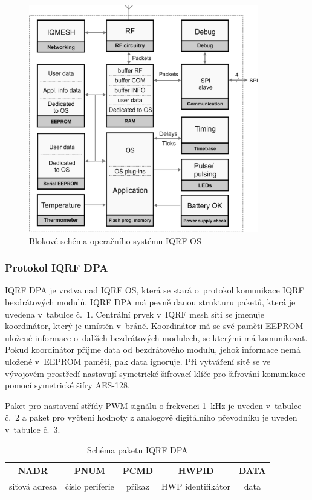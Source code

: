 \documentclass[12pt,a4paper]{article}
\begin{document}
\begin{figure}[H]
\centering
\label{fig:foto/iqrf-os}
\includegraphics[width = 100mm]{img/iqrf/os-blokove-schema.png}
\caption{Blokové schéma operačního systému IQRF OS}
\end{figure}

\newpage

\subsubsection{Protokol IQRF DPA}

IQRF DPA\cite{iqrf/dpa} je vrstva nad IQRF OS, která se stará o~protokol komunikace IQRF bezdrátových modulů. IQRF DPA má pevně danou strukturu paketů, která je uvedena v~tabulce č.~1. Centrální prvek v~IQRF mesh síti se jmenuje koordinátor, který je umístěn v~bráně. Koordinátor má se své paměti EEPROM uložené informace o~dalších bezdrátových modulech, se kterými má komunikovat. Pokud koordinátor přijme data od bezdrátového modulu, jehož informace nemá uložené v~EEPROM paměti, pak data ignoruje. Při vytváření sítě se ve vývojovém prostředí nastavují symetrické šifrovací klíče pro šifrování komunikace pomocí symetrické šifry AES-128.

Paket pro nastavení střídy PWM signálu o frekvenci 1~kHz je uveden v~tabulce č.~2 a paket pro vyčtení hodnoty z analogově digitálního převodníku je uveden v~tabulce č.~3.

\begin{table}[H]
\centering
\begin{tabular}{|c|c|c|c|c|}
\hline
NADR & PNUM & PCMD & HWPID & DATA \\
\hline
siťová adresa & číslo periferie & příkaz & HWP\index[zkr]{HWP!Hardware profile|textit} identifikátor & data \\
\hline
\end{tabular}
\caption{Schéma paketu IQRF DPA}\label{table:iqrf/dpa}
\end{table}
\end{document}
